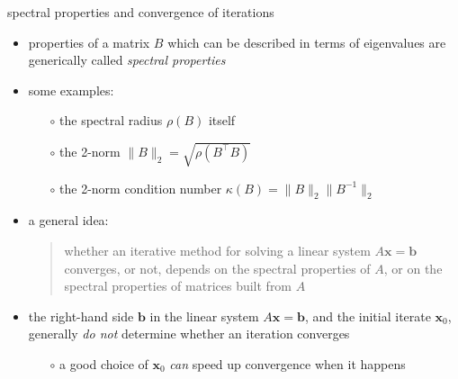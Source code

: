 \documentclass[10pt,hyperref]{beamer}
\newcommand{\bb}{\mathbf{b}}
\newcommand{\bx}{\mathbf{x}}
\begin{document}
\begin{frame}{spectral properties and convergence of iterations}

\begin{itemize}
\item properties of a matrix $B$ which can be described in terms of eigenvalues are generically called \emph{spectral properties}
\item some examples:
  \begin{itemize}
  \item[$\circ$] the spectral radius $\rho(B)$ itself
  \item[$\circ$] the 2-norm $\|B\|_2 = \sqrt{\rho(B^\top B)}$
  \item[$\circ$] the 2-norm condition number $\kappa(B)=\|B\|_2 \|B^{-1}\|_2$
  \end{itemize}

\medskip
\item a general idea:
\begin{quote}
whether an iterative method for solving a linear system $A\bx = \bb$ converges, or not, depends on the spectral properties of $A$, or on the spectral properties of matrices built from $A$
\end{quote}

\medskip
\item the right-hand side $\bb$ in the linear system $A\bx = \bb$, and the initial iterate $\bx_0$, generally \emph{do not} determine whether an iteration converges
  \begin{itemize}
  \item[$\circ$] a good choice of $\bx_0$ \emph{can} speed up convergence when it happens
  \end{itemize}
\end{itemize}
\end{frame}
\end{document}
